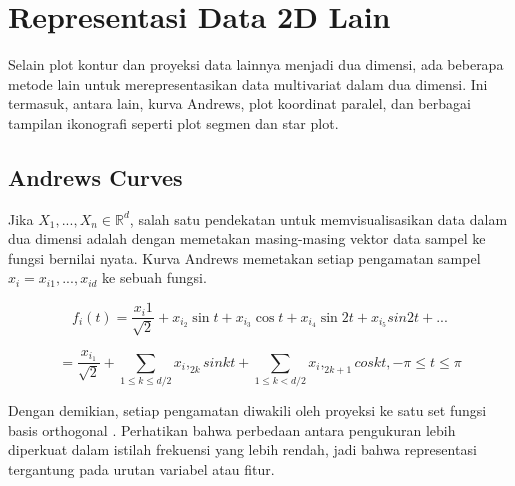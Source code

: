 \documentclass[a4paper,12pt]{article}
\theoremstyle{definition}
\begin{document}
\section{Representasi Data 2D Lain}
Selain plot kontur dan proyeksi data lainnya menjadi dua dimensi, ada beberapa metode lain untuk merepresentasikan data multivariat dalam dua dimensi. Ini termasuk, antara lain, kurva Andrews, plot koordinat paralel, dan berbagai tampilan ikonografi seperti plot segmen dan star plot.

\subsection{Andrews Curves}
Jika $X_1, . . . , X_n \in\mathbb{R}^d$, salah satu pendekatan untuk memvisualisasikan data dalam dua dimensi adalah dengan memetakan masing-masing vektor data sampel ke fungsi bernilai nyata. Kurva Andrews memetakan setiap pengamatan sampel $x_i = x_{i1}, . . . , x_{id}$ ke sebuah fungsi.

\begin{equation*}
f_i(t)=\frac{x_i1}{\sqrt{2}}+x_{i_2} \sin t+ x_{i_3} \cos t+ x_{i_4} \sin 2t+ x_{i_5} sin 2t+...
\end{equation*}

\begin{equation*}
= \frac{x_{i_1}}{\sqrt{2}} + \sum_{1\leq k\leq d/2} x_i, _{2k} sin kt + \sum_{1\leq k < d/2} x_i,_{2k+1} cos kt, -\pi \leq t\leq \pi 
\end{equation*}

Dengan demikian, setiap pengamatan diwakili oleh proyeksi ke satu set fungsi basis orthogonal      . Perhatikan bahwa perbedaan antara pengukuran lebih diperkuat dalam istilah frekuensi yang lebih rendah, jadi bahwa representasi tergantung pada urutan variabel atau fitur.
\end{document}
